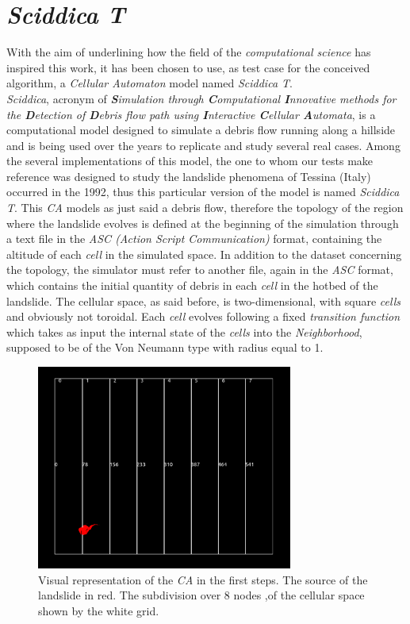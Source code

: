 \documentclass[12pt,a4paper,fleqn]{report}
\begin{document}
\section{\textit{Sciddica T}}
With the aim of underlining how the field of the \textit{computational science} has inspired this work, it has been chosen to use, as test case for the conceived algorithm, a \textit{Cellular Automaton} model named \textit{Sciddica T}.\\
\textit{Sciddica}, acronym of \textit{\textbf{S}imulation through \textbf{C}omputational \textbf{I}nnovative methods for the \textbf{D}etection of \textbf{D}ebris flow path using \textbf{I}nteractive \textbf{C}ellular \textbf{A}utomata}, is a computational model designed to simulate a debris flow running along a hillside and is being used over the years to replicate and study several real cases. Among the several implementations of this model, the one to whom our tests make reference was 
designed to study the landslide phenomena 
of Tessina (Italy) occurred in the 1992,
 thus this particular version of the
 model is named \textit{Sciddica T}. 
 This \textit{CA} models as just said a debris flow, therefore the topology of the region where the landslide evolves is defined at the beginning of the simulation through a text file in the \textit{ASC (Action Script Communication) } format, containing the altitude of each \textit{cell} in the simulated space. In addition to the dataset concerning the topology, the simulator must refer to another file, again in the \textit{ASC} format, which contains the initial quantity of debris in each \textit{cell} in the hotbed of the landslide. The cellular space, as said before, is two-dimensional, with square \textit{cells} and obviously not toroidal. Each \textit{cell} evolves following a fixed \textit{transition function} which takes as input the internal state of the \textit{cells} into the \textit{Neighborhood}, supposed to be of the Von Neumann type with radius equal to 1. \\
 \begin{figure}[ht!]
\centering
    \includegraphics[width=0.75\textwidth]{early_state}
    \caption{Visual representation of the \textit{CA} in the first steps. The source of the landslide in red. The subdivision over 8 nodes ,of the cellular space shown by the white grid.}
\end{figure}
\end{document}
